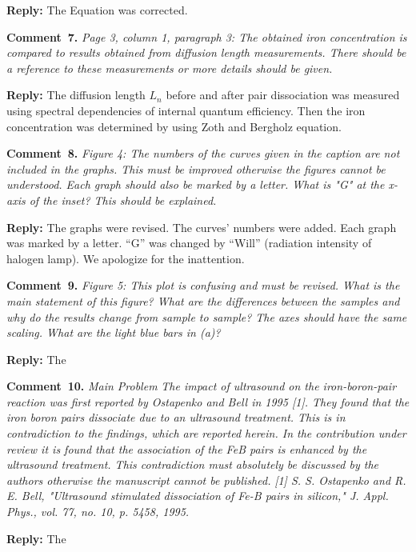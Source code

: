 \documentclass[aip,jap,preprint]{revtex4-1}
\begin{document}
\noindent
\textcolor[rgb]{0.51,0.00,0.00}{\textbf{Reply:}}
The Equation was corrected.

\vspace{1cm}
\noindent
\textcolor[rgb]{0.00,0.50,1.00}{\textbf{Comment~7.}}
\emph{Page 3, column 1, paragraph 3: The obtained iron concentration is compared to results obtained from diffusion length measurements. There should be a reference to these measurements or more details should be given.}

\noindent
\textcolor[rgb]{0.51,0.00,0.00}{\textbf{Reply:}}
The diffusion length $L_n$ before and after pair dissociation was measured using spectral dependencies of internal quantum efficiency.
Then the iron concentration was determined by using Zoth and Bergholz\cite{FeB_Zong} equation.


\vspace{1cm}
\noindent
\textcolor[rgb]{0.00,0.50,1.00}{\textbf{Comment~8.}}
\emph{Figure 4: The numbers of the curves given in the caption are not included in the graphs. This must be improved otherwise the figures cannot be understood. Each graph should also be marked by a letter. What is "G" at the x-axis of the inset? This should be explained. }


\noindent
\textcolor[rgb]{0.51,0.00,0.00}{\textbf{Reply:}}
The graphs were revised.
The curves' numbers were added.
Each graph was marked by a letter.
``G'' was changed by ``Will'' (radiation intensity of halogen lamp).
We apologize for the inattention.


\vspace{1cm}
\noindent
\textcolor[rgb]{0.00,0.50,1.00}{\textbf{Comment~9.}}
\emph{Figure 5: This plot is confusing and must be revised. What is the main statement of this figure? What are the differences between the samples and why do the results change from sample to sample? The axes should have the same scaling. What are the light blue bars in (a)? }

\noindent
\textcolor[rgb]{0.51,0.00,0.00}{\textbf{Reply:}}
The

\vspace{1cm}
\noindent
\textcolor[rgb]{0.00,0.50,1.00}{\textbf{Comment~10.}}
\emph{Main Problem}
\emph{The impact of ultrasound on the iron-boron-pair reaction was first reported by Ostapenko and Bell in 1995 [1]. They found that the iron boron pairs dissociate due to an ultrasound treatment. This is in contradiction to the findings, which are reported herein. In the contribution under review it is found that the association of the FeB pairs is enhanced by the ultrasound treatment. This contradiction must absolutely be discussed by the authors otherwise the manuscript cannot be published.}
\emph{
[1] S. S. Ostapenko and R. E. Bell, "Ultrasound stimulated dissociation of Fe-B pairs in silicon," J. Appl. Phys., vol. 77, no. 10, p. 5458, 1995.
 }

\noindent
\textcolor[rgb]{0.51,0.00,0.00}{\textbf{Reply:}}
The



\end{document}
